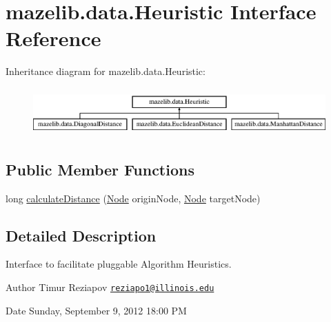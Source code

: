 \hypertarget{interfacemazelib_1_1data_1_1_heuristic}{\section{mazelib.\-data.\-Heuristic Interface Reference}
\label{interfacemazelib_1_1data_1_1_heuristic}
}
Inheritance diagram for mazelib.\-data.\-Heuristic\-:\begin{figure}[H]
\begin{center}
\leavevmode
\includegraphics[height=1.848185cm]{interfacemazelib_1_1data_1_1_heuristic}
\end{center}
\end{figure}
\subsection*{Public Member Functions}
\begin{DoxyCompactItemize}
\item 
long \hyperlink{interfacemazelib_1_1data_1_1_heuristic_a740b90bd253ed4ef33c7f18f8011215f}{calculate\-Distance} (\hyperlink{classmazelib_1_1data_1_1_node}{Node} origin\-Node, \hyperlink{classmazelib_1_1data_1_1_node}{Node} target\-Node)
\end{DoxyCompactItemize}


\subsection{Detailed Description}
Interface to facilitate pluggable Algorithm Heuristics. \begin{DoxyAuthor}{Author}
Timur Reziapov \href{mailto:reziapo1@illinois.edu}{\tt reziapo1@illinois.\-edu} 
\end{DoxyAuthor}
\begin{DoxyDate}{Date}
Sunday, September 9, 2012 18\-:00 P\-M 
\end{DoxyDate}


